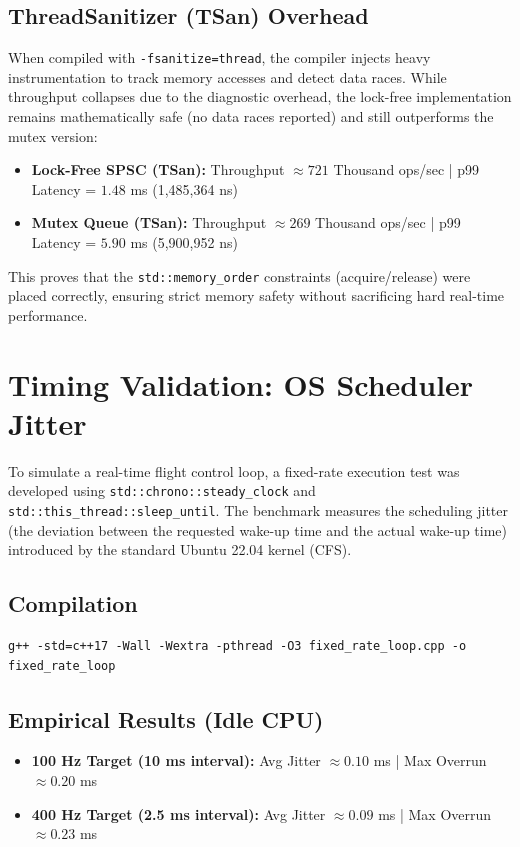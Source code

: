 \documentclass{article}
\begin{document}
\subsection{ThreadSanitizer (TSan) Overhead}
When compiled with \texttt{-fsanitize=thread}, the compiler injects heavy instrumentation to track memory accesses and detect data races. While throughput collapses due to the diagnostic overhead, the lock-free implementation remains mathematically safe (no data races reported) and still outperforms the mutex version:
\begin{itemize}
    \item \textbf{Lock-Free SPSC (TSan):} Throughput $\approx 721$ Thousand ops/sec | p99 Latency = $1.48$ ms (1,485,364 ns)
    \item \textbf{Mutex Queue (TSan):} Throughput $\approx 269$ Thousand ops/sec | p99 Latency = $5.90$ ms (5,900,952 ns)
\end{itemize}
This proves that the \texttt{std::memory\_order} constraints (acquire/release) were placed correctly, ensuring strict memory safety without sacrificing hard real-time performance.

\section{Timing Validation: OS Scheduler Jitter}
To simulate a real-time flight control loop, a fixed-rate execution test was developed using \texttt{std::chrono::steady\_clock} and \texttt{std::this\_thread::sleep\_until}. The benchmark measures the scheduling jitter (the deviation between the requested wake-up time and the actual wake-up time) introduced by the standard Ubuntu 22.04 kernel (CFS).

\subsection{Compilation}
\begin{verbatim}
g++ -std=c++17 -Wall -Wextra -pthread -O3 fixed_rate_loop.cpp -o fixed_rate_loop
\end{verbatim}

\subsection{Empirical Results (Idle CPU)}
\begin{itemize}
    \item \textbf{100 Hz Target (10 ms interval):} Avg Jitter $\approx 0.10$ ms | Max Overrun $\approx 0.20$ ms
    \item \textbf{400 Hz Target (2.5 ms interval):} Avg Jitter $\approx 0.09$ ms | Max Overrun $\approx 0.23$ ms
\end{itemize}
\end{document}
